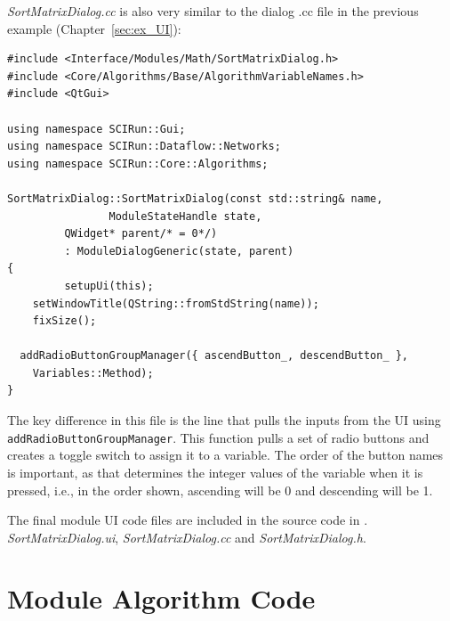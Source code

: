 \documentclass[fleqn,11pt,openany]{book}
\begin{document}
\emph{SortMatrixDialog.cc} is also very similar to the dialog .cc file in the previous example (Chapter~\ref{sec:ex_UI}):
\begin{verbatim}
#include <Interface/Modules/Math/SortMatrixDialog.h>
#include <Core/Algorithms/Base/AlgorithmVariableNames.h>
#include <QtGui>

using namespace SCIRun::Gui;
using namespace SCIRun::Dataflow::Networks;
using namespace SCIRun::Core::Algorithms;

SortMatrixDialog::SortMatrixDialog(const std::string& name, 
                ModuleStateHandle state,
         QWidget* parent/* = 0*/)
         : ModuleDialogGeneric(state, parent)
{
         setupUi(this);
	setWindowTitle(QString::fromStdString(name));
	fixSize();

  addRadioButtonGroupManager({ ascendButton_, descendButton_ }, 
  	Variables::Method);
}
\end{verbatim}
The key difference in this file is the line that pulls the inputs from the UI using \verb|addRadioButtonGroupManager|.
This function pulls a set of radio buttons and creates a toggle switch to assign it to a variable.  
The order of the button names is important, as that determines the integer values of the variable when it is pressed, i.e., in the order shown, ascending will be 0 and descending will be 1.

The final module UI code files are included in the source code in \emph{}.  \emph{SortMatrixDialog.ui}, \emph{SortMatrixDialog.cc} and \emph{SortMatrixDialog.h}.

\section{Module Algorithm Code}
\label{sec:algo}
\end{document}
